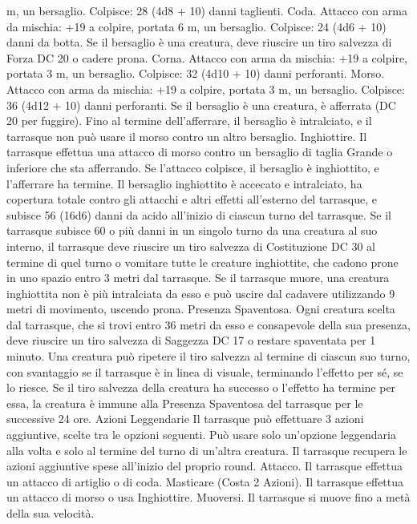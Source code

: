\begin{multicols}{2}
m, un bersaglio.
Colpisce: 28 (4d8 + 10) danni taglienti.
Coda. Attacco con arma da mischia: +19 a colpire, portata 6 m,
un bersaglio.
Colpisce: 24 (4d6 + 10) danni da botta. Se il bersaglio è una
creatura, deve riuscire un tiro salvezza di Forza DC 20 o cadere
prona.
Corna. Attacco con arma da mischia: +19 a colpire, portata 3 m,
un bersaglio.
Colpisce: 32 (4d10 + 10) danni perforanti.
Morso. Attacco con arma da mischia: +19 a colpire, portata 3 m,
un bersaglio.
Colpisce: 36 (4d12 + 10) danni perforanti. Se il bersaglio è una
creatura, è afferrata (DC 20 per fuggire). Fino al termine
dell’afferrare, il bersaglio è intralciato, e il tarrasque non può
usare il morso contro un altro bersaglio.
Inghiottire. Il tarrasque effettua una attacco di morso contro un
bersaglio di taglia Grande o inferiore che sta afferrando. Se
l’attacco colpisce, il bersaglio è inghiottito, e l’afferrare ha
termine. Il bersaglio inghiottito è accecato e intralciato, ha
copertura totale contro gli attacchi e altri effetti all’esterno del
tarrasque, e subisce 56 (16d6) danni da acido all’inizio di ciascun
turno del tarrasque.
Se il tarrasque subisce 60 o più danni in un singolo turno da una
creatura al suo interno, il tarrasque deve riuscire un tiro salvezza
di Costituzione DC 30 al termine di quel turno o vomitare tutte le
creature inghiottite, che cadono prone in uno spazio entro 3 metri
dal tarrasque. Se il tarrasque muore, una creatura inghiottita non
è più intralciata da esso e può uscire dal cadavere utilizzando 9
metri di movimento, uscendo prona.
Presenza Spaventosa. Ogni creatura scelta dal tarrasque, che si
trovi entro 36 metri da esso e consapevole della sua presenza,
deve riuscire un tiro salvezza di Saggezza DC 17 o restare
spaventata per 1 minuto. Una creatura può ripetere il tiro
salvezza al termine di ciascun suo turno, con svantaggio se il
tarrasque è in linea di visuale, terminando l’effetto per sé, se lo
riesce. Se il tiro salvezza della creatura ha successo o l’effetto ha
termine per essa, la creatura è immune alla Presenza Spaventosa
del tarrasque per le successive 24 ore.
Azioni Leggendarie
Il tarrasque può effettuare 3 azioni aggiuntive, scelte tra le
opzioni seguenti. Può usare solo un’opzione leggendaria alla
volta e solo al termine del turno di un’altra creatura. Il tarrasque
recupera le azioni aggiuntive spese all’inizio del proprio round.
Attacco. Il tarrasque effettua un attacco di artiglio o di coda.
Masticare (Costa 2 Azioni). Il tarrasque effettua un attacco di
morso o usa Inghiottire.
Muoversi. Il tarrasque si muove fino a metà della sua velocità.
 

\end{multicols}
